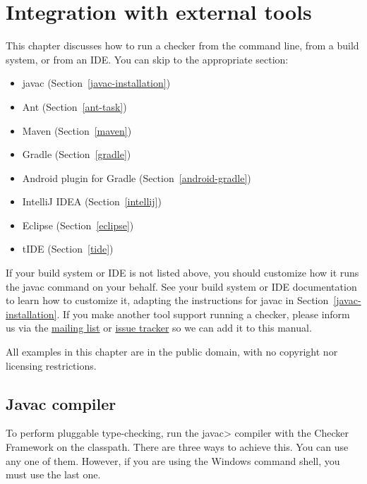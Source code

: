 \htmlhr
\chapter{Integration with external tools\label{external-tools}}

This chapter discusses how to run a checker from the command line, from a
build system, or from an IDE\@.  You can skip to the appropriate section:

\begin{itemize}
\item javac (Section~\ref{javac-installation})
\item Ant (Section~\ref{ant-task})
\item Maven (Section~\ref{maven})
\item Gradle (Section~\ref{gradle})
\item Android plugin for Gradle (Section~\ref{android-gradle})
\item IntelliJ IDEA (Section~\ref{intellij})
\item Eclipse (Section~\ref{eclipse})
\item tIDE (Section~\ref{tide})
\end{itemize}

If your build system or IDE is not listed above, you should customize how
it runs the javac command on your behalf.  See your build system or IDE
documentation to learn how to
customize it, adapting the instructions for javac in Section~\ref{javac-installation}.
If you make another tool support running a checker, please
inform us via the
\href{https://groups.google.com/forum/#!forum/checker-framework-discuss}{mailing
  list} or
\href{https://github.com/typetools/checker-framework/issues}{issue tracker} so
we can add it to this manual.

All examples in this chapter are in the public domain, with no copyright nor
licensing restrictions.


\section{Javac compiler\label{javac-installation}}

To perform pluggable type-checking, run the \<javac> compiler with the
Checker Framework on the classpath.
There are three ways to achieve this.  You can use any
one of them.  However, if you are using the Windows command shell, you must
use the last one.



